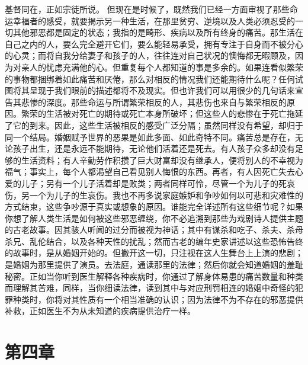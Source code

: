 基督同在，正如宗徒所说。\newline{} 但现在是时候了，既然我们已经一方面审视了那些命运幸福者的感受，就要揭示另一种生活，在那里贫穷、逆境以及人类必须忍受的一切其他邪恶都是固定的状态；我指的是畸形、疾病以及所有终身的痛苦。那生活在自己之内的人，要么完全避开它们，要么能轻易承受，拥有专注于自身而不被分心的心灵；而将自我分给妻子和孩子的人，往往连对自己状况的懊悔都无暇顾及，因为对亲人的忧虑充满他的心。但重复每个人都知道的事是多余的。如果连看似繁荣的事物都捆绑着如此痛苦和厌倦，那么对相反的情况我们还能期待什么呢？任何试图将其呈现于我们眼前的描述都将不及现实。但也许我们可以用很少的几句话来宣告其悲惨的深度。那些命运与所谓繁荣相反的人，其悲伤也来自与繁荣相反的原因。繁荣的生活被对死亡的期待或死亡本身所破坏；但这些人的悲惨在于死亡拖延了它的到来。因此，这些生活被相反的感受广泛分隔；虽然同样没有希望，却归于同一个结局。婚姻赋予世界的恶果是如此多面、如此奇特不同。痛苦总是存在，无论孩子出生，还是永远不能期待，无论他们活着还是死去。有人孩子众多却没有足够的生活资料；有人辛勤劳作积攒了巨大财富却没有继承人，便将别人的不幸视为福气；事实上，每个人都渴望自己看见别人悔恨的东西。再者，有人因死亡失去心爱的儿子；另有一个儿子活着却是败类；两者同样可怜，尽管一个为儿子的死哀伤，另一个为儿子的生哀伤。我也不再多说家庭嫉妒和争吵如何以可悲和灾难性的方式结束，这些争吵源于真实或想象的原因。谁能完全详述所有这些细节呢？如果你想了解人类生活是如何被这些邪恶缠绕，你不必追溯到那些为戏剧诗人提供主题的古老故事。因其骇人听闻的过分而被视为神话；其中有谋杀和吃子、杀夫、杀母杀兄、乱伦结合，以及各种天性的扰乱；然而古老的编年史家讲述以这些恐怖告终的故事时，是从婚姻开始的。但撇开这一切，只注视在这人生舞台上上演的悲剧；是婚姻为那里提供了演员。去法庭，通读那里的法律；然后你就会知道婚姻的羞耻秘密。正如当你听到医生解释各种疾病时，你通过了解身体易患的痛苦数量和种类而理解其苦难，同样，当你细读法律，读到其中与对应刑罚相连的婚姻中奇怪的犯罪种类时，你将对其性质有一个相当准确的认识；因为法律不为不存在的邪恶提供补救，正如医生不为从未知道的疾病提供治疗一样。\par


\section{第四章}


